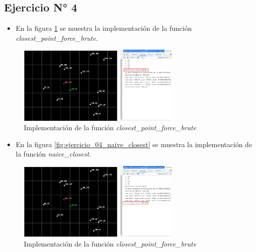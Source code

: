 \documentclass{article}
\begin{document}
\clearpage
\subsection{Ejercicio N° 4}
\begin{itemize}
	\item En la figura \ref{fig:ejercicio_04_closest_point_brute_force} se muestra la implementación de la función \textit{closest\_point\_force\_brute}.
\end{itemize}
\begin{figure}[h!]
	\centering
	\includegraphics[width=0.7\textwidth]{img/ejercicio_04_closest_point_brute_force.png}
	\caption{Implementación de la función \textit{closest\_point\_force\_brute}}
	\label{fig:ejercicio_04_closest_point_brute_force}
\end{figure}

\begin{itemize}
	\item En la figura \ref{fig:ejercicio_04_naive_closest} se muestra la implementación de la función \textit{naive\_closest}.
\end{itemize}
\begin{figure}[h!]
	\centering
	\includegraphics[width=0.7\textwidth]{img/jercicio_04_naive_closest.png}
	\caption{Implementación de la función \textit{closest\_point\_force\_brute}}
	\label{fig:jercicio_04_naive_closest}
\end{figure}

\clearpage
\end{document}
